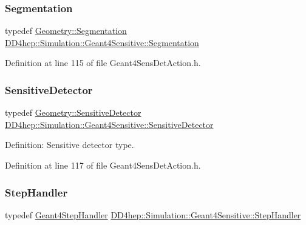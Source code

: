 \subsubsection{\texorpdfstring{Segmentation}{Segmentation}}
{\footnotesize\ttfamily typedef \hyperlink{class_d_d4hep_1_1_geometry_1_1_segmentation}{Geometry\+::\+Segmentation} \hyperlink{class_d_d4hep_1_1_simulation_1_1_geant4_sensitive_ac898770dc0c398f3b7b88d1bf5f72314}{D\+D4hep\+::\+Simulation\+::\+Geant4\+Sensitive\+::\+Segmentation}}



Definition at line 115 of file Geant4\+Sens\+Det\+Action.\+h.

\hypertarget{class_d_d4hep_1_1_simulation_1_1_geant4_sensitive_a985a23f6592b3ab41b9aa45e47fbc9ea}{}\label{class_d_d4hep_1_1_simulation_1_1_geant4_sensitive_a985a23f6592b3ab41b9aa45e47fbc9ea} 
\subsubsection{\texorpdfstring{Sensitive\+Detector}{SensitiveDetector}}
{\footnotesize\ttfamily typedef \hyperlink{class_d_d4hep_1_1_geometry_1_1_sensitive_detector}{Geometry\+::\+Sensitive\+Detector} \hyperlink{class_d_d4hep_1_1_simulation_1_1_geant4_sensitive_a985a23f6592b3ab41b9aa45e47fbc9ea}{D\+D4hep\+::\+Simulation\+::\+Geant4\+Sensitive\+::\+Sensitive\+Detector}}



Definition\+: Sensitive detector type. 



Definition at line 117 of file Geant4\+Sens\+Det\+Action.\+h.

\hypertarget{class_d_d4hep_1_1_simulation_1_1_geant4_sensitive_a6df3adaabfad8e56f08282f2cf70a9b7}{}\label{class_d_d4hep_1_1_simulation_1_1_geant4_sensitive_a6df3adaabfad8e56f08282f2cf70a9b7} 
\subsubsection{\texorpdfstring{Step\+Handler}{StepHandler}}
{\footnotesize\ttfamily typedef \hyperlink{class_d_d4hep_1_1_simulation_1_1_geant4_step_handler}{Geant4\+Step\+Handler} \hyperlink{class_d_d4hep_1_1_simulation_1_1_geant4_sensitive_a6df3adaabfad8e56f08282f2cf70a9b7}{D\+D4hep\+::\+Simulation\+::\+Geant4\+Sensitive\+::\+Step\+Handler}}



